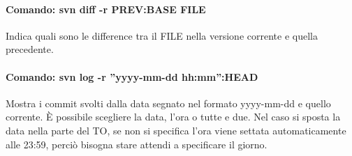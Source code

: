 \paragraph{Comando: svn diff -r PREV:BASE FILE}
Indica quali sono le difference tra il FILE nella versione corrente e quella precedente.
\paragraph{Comando: svn log -r ''{yyyy-mm-dd hh:mm}'':HEAD}
Mostra i commit svolti dalla data segnato nel formato yyyy-mm-dd e quello corrente. \`E possibile scegliere la data, l'ora o tutte e due. Nel caso si sposta la data nella parte del TO, se non si specifica l'ora viene settata automaticamente alle 23:59, perci\`o bisogna stare attendi a specificare il giorno.

